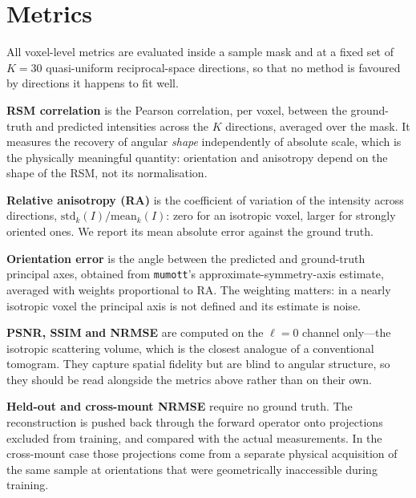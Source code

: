 \documentclass[11pt,a4paper]{article}
\begin{document}
\appendix

\section{Metrics}
\label{sec:metrics}

All voxel-level metrics are evaluated inside a sample mask and at a fixed set of $K=30$
quasi-uniform reciprocal-space directions, so that no method is favoured by directions it
happens to fit well.

\textbf{RSM correlation} is the Pearson correlation, per voxel, between the ground-truth
and predicted intensities across the $K$ directions, averaged over the mask. It measures
the recovery of angular \emph{shape} independently of absolute scale, which is the
physically meaningful quantity: orientation and anisotropy depend on the shape of the RSM,
not its normalisation.

\textbf{Relative anisotropy (RA)} is the coefficient of variation of the intensity across
directions, $\mathrm{std}_k(I)/\mathrm{mean}_k(I)$: zero for an isotropic voxel, larger for
strongly oriented ones. We report its mean absolute error against the ground truth.

\textbf{Orientation error} is the angle between the predicted and ground-truth principal
axes, obtained from \texttt{mumott}'s approximate-symmetry-axis estimate, averaged with
weights proportional to RA. The weighting matters: in a nearly isotropic voxel the
principal axis is not defined and its estimate is noise.

\textbf{PSNR, SSIM} \citep{Wang2004} \textbf{and NRMSE} are computed on the $\ell=0$ channel only---the isotropic
scattering volume, which is the closest analogue of a conventional tomogram. They capture
spatial fidelity but are blind to angular structure, so they should be read alongside the
metrics above rather than on their own.

\textbf{Held-out and cross-mount NRMSE} require no ground truth. The reconstruction is
pushed back through the forward operator onto projections excluded from training, and
compared with the actual measurements. In the cross-mount case those projections come from
a separate physical acquisition of the same sample at orientations that were geometrically
inaccessible during training.


\end{document}

